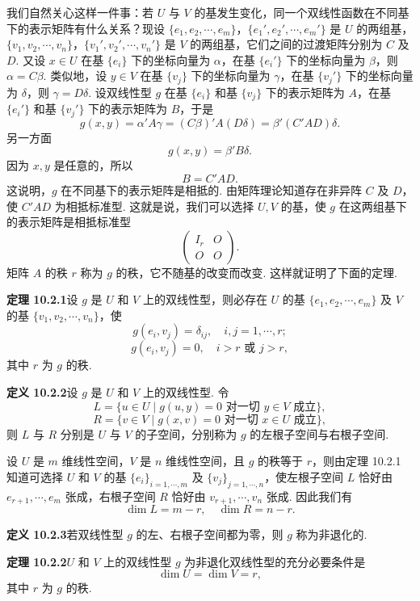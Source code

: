 \documentclass[UTF8, 12pt, fontset=fandol, oneside]{ctexart}
\begin{document}
我们自然关心这样一件事：若 $U$ 与 $V$ 的基发生变化，同一个双线性函数在不同基下的表示矩阵有什么关系？现设 $\{e_1,e_2,\cdots,e_m\}$，$\{e_1',e_2',\cdots,e_m'\}$ 是 $U$ 的两组基，$\{v_1,v_2,\cdots,v_n\}$，$\{v_1',v_2',\cdots,v_n'\}$ 是 $V$ 的两组基，它们之间的过渡矩阵分别为 $C$ 及 $D$. 又设 $x\in U$ 在基 $\{e_i\}$ 下的坐标向量为 $\alpha$，在基 $\{e_i'\}$ 下的坐标向量为 $\beta$，则 $\alpha=C\beta$. 类似地，设 $y\in V$ 在基 $\{v_j\}$ 下的坐标向量为 $\gamma$，在基 $\{v_j'\}$ 下的坐标向量为 $\delta$，则 $\gamma=D\delta$. 设双线性型 $g$ 在基 $\{e_i\}$ 和基 $\{v_j\}$ 下的表示矩阵为 $A$，在基 $\{e_i'\}$ 和基 $\{v_j'\}$ 下的表示矩阵为 $B$，于是
\[
  g(x,y)=\alpha' A\gamma=(C\beta)'A(D\delta)=\beta'(C'AD)\delta.
\]
另一方面
\[
  g(x,y)=\beta'B\delta.
\]
因为 $x,y$ 是任意的，所以
\[
  B=C'AD.
\]
这说明，$g$ 在不同基下的表示矩阵是相抵的. 由矩阵理论知道存在非异阵 $C$ 及 $D$，使 $C'AD$ 为相抵标准型. 这就是说，我们可以选择 $U,V$ 的基，使 $g$ 在这两组基下的表示矩阵是相抵标准型
\[
  \left(\begin{array}{cc}
  I_r&O\\
  O&O
  \end{array}\right).
\]
矩阵 $A$ 的秩 $r$ 称为 $g$ 的秩，它不随基的改变而改变. 这样就证明了下面的定理.

\noindent\textbf{定理 10.2.1}\quad 设 $g$ 是 $U$ 和 $V$ 上的双线性型，则必存在 $U$ 的基 $\{e_1,e_2,\cdots,e_m\}$ 及 $V$ 的基 $\{v_1,v_2,\cdots,v_n\}$，使
\[
  g(e_i,v_j)=\delta_{ij},\quad i,j=1,\cdots,r;
\]
\[
  g(e_i,v_j)=0,\quad i>r\text{ 或 }j>r,
\]
其中 $r$ 为 $g$ 的秩.

\noindent\textbf{定义 10.2.2}\quad 设 $g$ 是 $U$ 和 $V$ 上的双线性型. 令
\[
  L=\{u\in U\mid g(u,y)=0\text{ 对一切 }y\in V\text{ 成立}\},
\]
\[
  R=\{v\in V\mid g(x,v)=0\text{ 对一切 }x\in U\text{ 成立}\},
\]
则 $L$ 与 $R$ 分别是 $U$ 与 $V$ 的子空间，分别称为 $g$ 的左根子空间与右根子空间.

设 $U$ 是 $m$ 维线性空间，$V$ 是 $n$ 维线性空间，且 $g$ 的秩等于 $r$，则由定理 10.2.1 知道可选择 $U$ 和 $V$ 的基 $\{e_i\}_{i=1,\cdots,m}$ 及 $\{v_j\}_{j=1,\cdots,n}$，使左根子空间 $L$ 恰好由 $e_{r+1},\cdots,e_m$ 张成，右根子空间 $R$ 恰好由 $v_{r+1},\cdots,v_n$ 张成. 因此我们有
\begin{equation}
  \dim L=m-r,\quad \dim R=n-r.
  \tag{10.2.3}
\end{equation}

\noindent\textbf{定义 10.2.3}\quad 若双线性型 $g$ 的左、右根子空间都为零，则 $g$ 称为非退化的.

\noindent\textbf{定理 10.2.2}\quad $U$ 和 $V$ 上的双线性型 $g$ 为非退化双线性型的充分必要条件是
\[
  \dim U=\dim V=r,
\]
其中 $r$ 为 $g$ 的秩.
\end{document}
